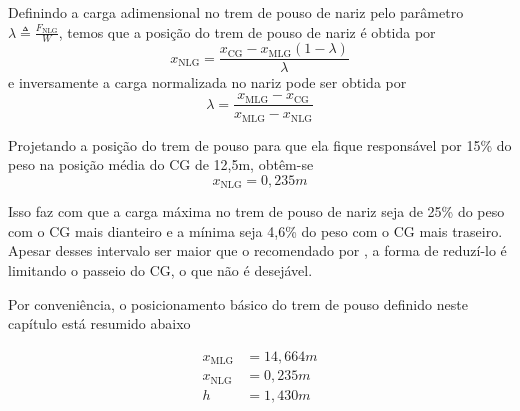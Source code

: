 Definindo a carga adimensional no trem de pouso de nariz pelo parâmetro $\lambda \triangleq \frac{F_\text{NLG}}{W}$, temos que a posição do trem de pouso de nariz é obtida por
\begin{equation}
x_\text{NLG} = \frac{x_\text{CG} - x_\text{MLG}(1-\lambda)}{\lambda}
\end{equation}
e inversamente a carga normalizada no nariz pode ser obtida por
\begin{equation}
\lambda = \frac{x_\text{MLG} - x_\text{CG}}{x_\text{MLG}-x_\text{NLG}}
\end{equation}

Projetando a posição do trem de pouso para que ela fique responsável por 15\% do peso na posição média do CG de 12,5m, obtêm-se
\begin{equation}
x_\text{NLG} = 0,235\si{m}
\end{equation}

Isso faz com que a carga máxima no trem de pouso de nariz seja de 25\% do peso com o CG mais dianteiro e a mínima seja 4,6\% do peso com o CG mais traseiro.
Apesar desses intervalo ser maior que o recomendado por \cite{gudmundsson}, a forma de reduzí-lo é limitando o passeio do CG, o que não é desejável.

Por conveniência, o posicionamento básico do trem de pouso definido neste capítulo está resumido abaixo

\begin{align*}
x_\text{MLG} &= 14,664\si{m}\\
x_\text{NLG} &= 0,235\si{m}\\
h            &= 1,430 \si{m}
\end{align*}
